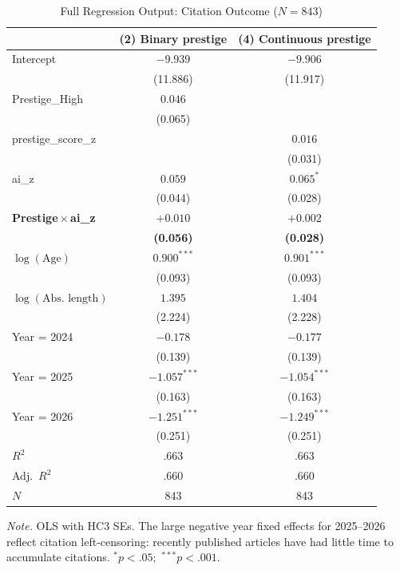 \documentclass[12pt,a4paper]{article}
\begin{document}
\begin{table}[htbp]
\centering
\caption{Full Regression Output: Citation Outcome ($N = 843$)}
\label{tab:b1_citations}
\begin{threeparttable}
\small
\begin{tabular}{lcc}
\toprule
 & (2) Binary prestige & (4) Continuous prestige \\
\midrule
Intercept
  & $-9.939$ & $-9.906$ \\
  & (11.886) & (11.917) \\[3pt]
Prestige\_High
  & $0.046$ & \\
  & (0.065) & \\[3pt]
prestige\_score\_z
  & & $0.016$ \\
  & & (0.031) \\[3pt]
ai\_z
  & $0.059$ & $0.065^{*}$ \\
  & (0.044) & (0.028)    \\[3pt]
\textbf{Prestige\,$\times$\,ai\_z}
  & $\mathbf{+0.010}$ & $\mathbf{+0.002}$ \\
  & \textbf{(0.056)}  & \textbf{(0.028)}  \\[3pt]
$\log(\text{Age})$
  & $0.900^{***}$ & $0.901^{***}$ \\
  & (0.093)       & (0.093)       \\[3pt]
$\log(\text{Abs.\ length})$
  & $1.395$ & $1.404$ \\
  & (2.224) & (2.228) \\[3pt]
Year = 2024
  & $-0.178$ & $-0.177$ \\
  & (0.139)  & (0.139)  \\[3pt]
Year = 2025
  & $-1.057^{***}$ & $-1.054^{***}$ \\
  & (0.163)        & (0.163)        \\[3pt]
Year = 2026
  & $-1.251^{***}$ & $-1.249^{***}$ \\
  & (0.251)        & (0.251)        \\[3pt]
\midrule
$R^2$       & .663 & .663 \\
Adj.\ $R^2$ & .660 & .660 \\
$N$         & 843  & 843  \\
\bottomrule
\end{tabular}
\begin{tablenotes}
\footnotesize
\item \textit{Note.} OLS with HC3 SEs. The large negative year fixed effects
  for 2025--2026 reflect citation left-censoring: recently published
  articles have had little time to accumulate citations.
  $^{*}p<.05$;\ $^{***}p<.001$.
\end{tablenotes}
\end{threeparttable}
\end{table}
\end{document}
